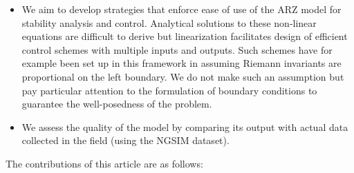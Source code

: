\documentclass[preprint]{elsarticle}
\begin{document}
\begin{itemize}
\item We aim to develop strategies that enforce ease of use of the ARZ model for stability analysis and control. Analytical solutions to these non-linear equations are difficult to derive but linearization facilitates design of efficient control schemes with multiple inputs and outputs. Such schemes have for example been set up in this framework in \cite{lamare2014} assuming Riemann invariants are proportional on the left boundary. We do not make such an assumption but pay particular attention to the formulation of boundary conditions to guarantee the well-posedness of the problem.
\item We assess the quality of the model by comparing its output with actual data collected in the field (using the NGSIM dataset). 
\end{itemize}

The contributions of this article are as follows:
\end{document}
